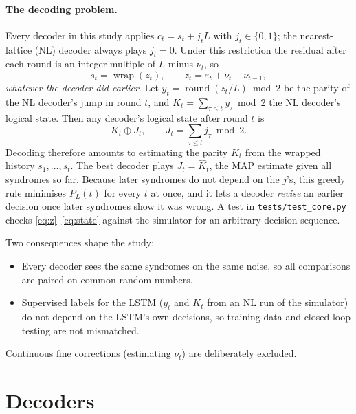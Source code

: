\paragraph{The decoding problem.}
Every decoder in this study applies $c_t=s_t+j_tL$ with $j_t\in\{0,1\}$; the
nearest-lattice (NL) decoder always plays $j_t=0$. Under this restriction the
residual after each round is an integer multiple of $L$ minus $\nu_t$, so
\begin{equation}
  s_t=\operatorname{wrap}(z_t),\qquad z_t=\varepsilon_t+\nu_t-\nu_{t-1},
  \label{eq:z}
\end{equation}
\emph{whatever the decoder did earlier}. Let
$y_t=\operatorname{round}(z_t/L)\bmod 2$ be the parity of the NL decoder's
jump in round $t$, and $K_t=\sum_{\tau\le t}y_\tau\bmod 2$ the NL decoder's
logical state. Then any decoder's logical state after round $t$ is
\begin{equation}
  K_t\oplus J_t,\qquad J_t=\sum_{\tau\le t}j_\tau\bmod 2 .
  \label{eq:state}
\end{equation}
Decoding therefore amounts to estimating the parity $K_t$ from the wrapped
history $s_1,\dots,s_t$. The best decoder plays $J_t=\hat K_t$, the MAP
estimate given all syndromes so far. Because later syndromes do not depend on
the $j$'s, this greedy rule minimises $P_L(t)$ for every $t$ at once, and it
lets a decoder \emph{revise} an earlier decision once later syndromes show it
was wrong. A test in \texttt{tests/test\_core.py} checks
\eqref{eq:z}--\eqref{eq:state} against the simulator for an arbitrary decision
sequence.

Two consequences shape the study:
\begin{itemize}
  \item Every decoder sees the same syndromes on the same noise, so all
    comparisons are paired on common random numbers.
  \item Supervised labels for the LSTM ($y_t$ and $K_t$ from an NL run of the
    simulator) do not depend on the LSTM's own decisions, so training data
    and closed-loop testing are not mismatched.
\end{itemize}
Continuous fine corrections (estimating $\nu_t$) are deliberately excluded.

\section{Decoders}\label{sec:decoders}

